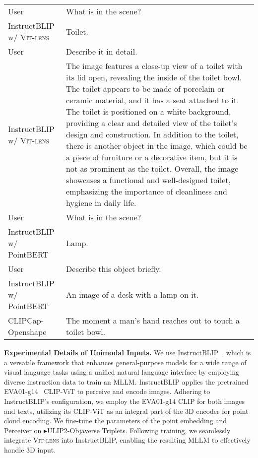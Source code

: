 \documentclass{article}
\newcommand{\clipvit}{CLIP-ViT\xspace}
\newcommand{\methodname}{{\scshape Vit-lens}\xspace}
\newcommand{\dsB}{{\textcolor{mygreen}{$\blacktriangleright$}}}
\begin{document}
\begin{table}[h]
\begin{minipage}{0.99\textwidth}
{\begin{tabular}{l p{10.5cm} }
User & What is in the scene? \\
InstructBLIP w/ \methodname & Toilet.\\
User & Describe it in detail. \\
InstructBLIP w/ \methodname & The image features a close-up view of a toilet with its lid open, revealing the inside of the toilet bowl. The toilet appears to be made of porcelain or ceramic material, and it has a seat attached to it. The toilet is positioned on a white background, providing a clear and detailed view of the toilet's design and construction. In addition to the toilet, there is another object in the image, which could be a piece of furniture or a decorative item, but it is not as prominent as the toilet. Overall, the image showcases a functional and well-designed toilet, emphasizing the importance of cleanliness and hygiene in daily life.
\\
\midrule
User & What is in the scene? \\
InstructBLIP w/ PointBERT &  Lamp. \\
User & Describe this object briefly. \\
InstructBLIP w/ PointBERT & An image of a desk with a lamp on it. \\
\midrule
CLIPCap-Openshape~\cite{mokady2021clipcap,liu2023openshape} & The moment a man's hand reaches out to touch a toilet bowl. \\
\bottomrule
\end{tabular}
} 
\end{minipage}
\end{table} 
\textbf{Experimental Details of Unimodal Inputs.} We use InstructBLIP~\cite{dai2023instructblip}, which is a versatile framework that enhances general-purpose models for a wide range of visual language tasks using a unified natural language interface by employing diverse instruction data to train an MLLM. InstructBLIP applies the pretrained EVA01-g14~\cite{fang2023eva} \clipvit to perceive and encode images. 
Adhering to InstructBLIP's configuration, we employ the EVA01-g14 CLIP for both images and texts, utilizing its \clipvit as an integral part of the 3D encoder for point cloud encoding. We fine-tune the parameters of the point embedding and Perceiver on \dsB ULIP2-Objaverse Triplets. Following training, we seamlessly integrate \methodname into InstructBLIP, enabling the resulting MLLM to effectively handle 3D input. 
\end{document}
